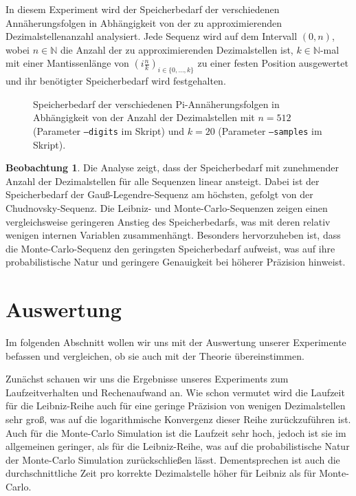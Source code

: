 \documentclass{scrartcl}
\theoremstyle{definition}
\newtheorem{approximation sequence}{Annäherungsfolge}
\newtheorem{observation}{Beobachtung}
\begin{document}
In diesem Experiment wird der Speicherbedarf der verschiedenen
Annäherungsfolgen in Abhängigkeit von der zu approximierenden
Dezimalstellenanzahl analysiert. Jede Sequenz wird auf dem Intervall \((0,
n)\), wobei \(n \in \mathbb{N}\) die Anzahl der zu approximierenden
Dezimalstellen ist, \(k \in \mathbb{N}\)-mal mit einer Mantissenlänge von
\(\left(i \frac{n}{k}\right)_{i \in \{0, \ldots, k\}}\) zu einer festen
Position ausgewertet und ihr benötigter Speicherbedarf wird festgehalten.

\begin{figure}[H]
    \centering
    
    \caption{
        Speicherbedarf der verschiedenen Pi-Annäherungsfolgen in Abhängigkeit
        von der Anzahl der Dezimalstellen mit \(n = 512\) (Parameter
        \texttt{--digits} im Skript) und \(k = 20\) (Parameter
        \texttt{--samples} im Skript).
    }
    \label{fig:memory-usage}
\end{figure}

\begin{observation}
    Die Analyse zeigt, dass der Speicherbedarf mit zunehmender Anzahl der
    Dezimalstellen für alle Sequenzen linear ansteigt. Dabei ist der
    Speicherbedarf der Gauß-Legendre-Sequenz am höchsten, gefolgt von der
    Chudnovsky-Sequenz. Die Leibniz- und Monte-Carlo-Sequenzen zeigen einen
    vergleichsweise geringeren Anstieg des Speicherbedarfs, was mit deren
    relativ wenigen internen Variablen zusammenhängt. Besonders hervorzuheben
    ist, dass die Monte-Carlo-Sequenz den geringsten Speicherbedarf aufweist,
    was auf ihre probabilistische Natur und geringere Genauigkeit bei höherer
    Präzision hinweist.
\end{observation}

\section{Auswertung}
Im folgenden Abschnitt wollen wir uns mit der Auswertung unserer Experimente
befassen und vergleichen, ob sie auch mit der Theorie übereinstimmen.

Zunächst schauen wir uns die Ergebnisse unseres Experiments zum
Laufzeitverhalten und Rechenaufwand an. Wie schon vermutet wird die Laufzeit
für die Leibniz-Reihe auch für eine geringe Präzision von wenigen
Dezimalstellen sehr groß, was auf die logarithmische Konvergenz dieser Reihe
zurückzuführen ist. Auch für die Monte-Carlo Simulation ist die Laufzeit sehr
hoch, jedoch ist sie im allgemeinen geringer, als für die Leibniz-Reihe, was
auf die probabilistische Natur der Monte-Carlo Simulation zurückschließen
lässt. Dementsprechen ist auch die durchschnittliche Zeit pro korrekte
Dezimalstelle höher für Leibniz als für Monte-Carlo.
\end{document}
